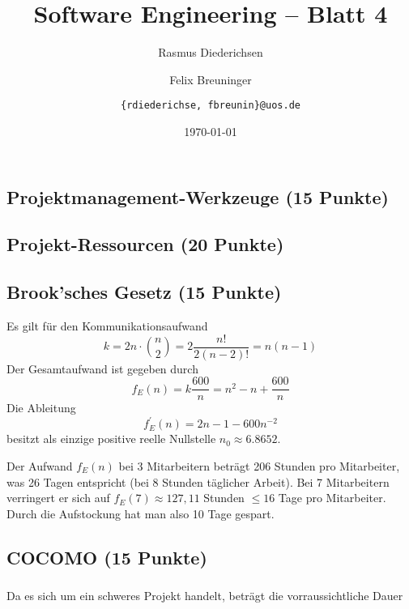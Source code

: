 \documentclass{scrartcl}
\title{\rmfamily Software Engineering -- Blatt 4}
\author{Rasmus Diederichsen \and Felix Breuninger\and %
   \texttt{\{rdiederichse, fbreunin\}@uos.de}
}
\date{\today}
\begin{document}
\selectfont
\maketitle

\setcounter{section}{4}
\setcounter{subsection}{0}

\subsection{Projektmanagement-Werkzeuge (15 Punkte)}

\subsection{Projekt-Ressourcen (20 Punkte)}

\subsection{Brook'sches Gesetz (15 Punkte)}

Es gilt für den Kommunikationsaufwand
\begin{equation*}
   k = 2n \cdot {n \choose 2} = 2 \frac{n!}{2(n-2)!} = n(n-1)
\end{equation*}
Der Gesamtaufwand ist gegeben durch
\begin{equation*}
   f_E(n) = k \frac{600}{n} = n^2 - n + \frac{600}{n}
\end{equation*}
Die Ableitung
\begin{equation*}
   f_E^\prime(n) = 2n -1 - 600n^{-2}
\end{equation*}
besitzt als einzige positive reelle Nullstelle $n_0 \approx 6.8652$.

Der Aufwand $f_E(n)$ bei 3 Mitarbeitern beträgt 206 Stunden pro Mitarbeiter, was
26 Tagen entspricht (bei 8 Stunden täglicher Arbeit).
Bei 7 Mitarbeitern verringert er sich auf $f_E(7)\approx 127,11$ Stunden $\le
16$ Tage pro Mitarbeiter. Durch die Aufstockung hat man also 10 Tage gespart.

\subsection{COCOMO (15 Punkte)}

\subsubsection{}

Da es sich um ein schweres Projekt handelt, beträgt die vorraussichtliche Dauer
\end{document}

